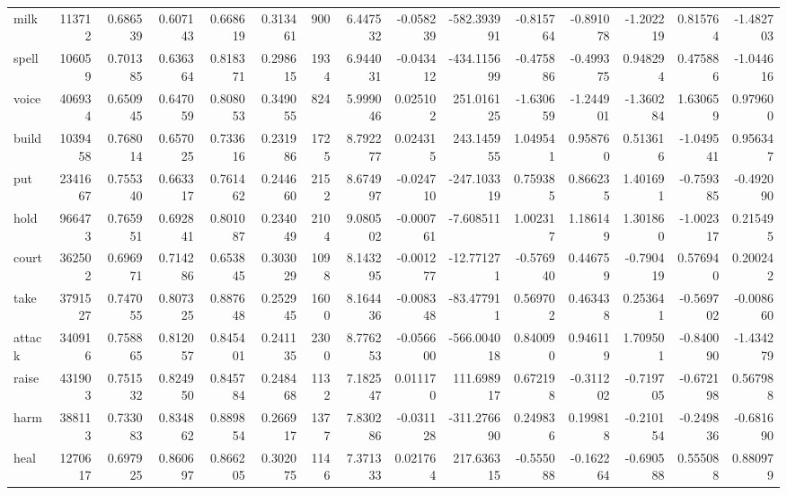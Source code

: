 \begin{tabular}{lrrrrrrrrrrrrrr}
milk      &    113712 &  0.686539 &      0.607143 &    0.668619 &  0.313461 &   900 &  6.447532 & -0.058239 & -582.393991 & -0.815764 & -0.891078 & -1.202219 &      0.815764 &        -1.482703 \\
spell     &    106059 &  0.701385 &      0.636364 &    0.818371 &  0.298615 &  1934 &  6.944031 & -0.043412 & -434.115699 & -0.475886 & -0.499375 &  0.948294 &      0.475886 &        -1.044616 \\
voice     &    406934 &  0.650945 &      0.647059 &    0.808053 &  0.349055 &   824 &  5.999046 &  0.025102 &  251.016125 & -1.630659 & -1.244901 & -1.360284 &      1.630659 &         0.979600 \\
build     &   1039458 &  0.768014 &      0.657025 &    0.733616 &  0.231986 &  1725 &  8.792277 &  0.024315 &  243.145955 &  1.049541 &  0.958760 &  0.513616 &     -1.049541 &         0.956347 \\
put       &   2341667 &  0.755340 &      0.663317 &    0.761462 &  0.244660 &  2152 &  8.674997 & -0.024710 & -247.103319 &  0.759385 &  0.866235 &  1.401691 &     -0.759385 &        -0.492090 \\
hold      &    966473 &  0.765951 &      0.692841 &    0.801087 &  0.234049 &  2104 &  9.080502 & -0.000761 &   -7.608511 &  1.002317 &  1.186149 &  1.301860 &     -1.002317 &         0.215495 \\
court     &    362502 &  0.696971 &      0.714286 &    0.653845 &  0.303029 &  1098 &  8.143295 & -0.001277 &  -12.771271 & -0.576940 &  0.446759 & -0.790419 &      0.576940 &         0.200242 \\
take      &   3791527 &  0.747055 &      0.807325 &    0.887648 &  0.252945 &  1600 &  8.164436 & -0.008348 &  -83.477911 &  0.569702 &  0.463438 &  0.253641 &     -0.569702 &        -0.008660 \\
attack    &    340916 &  0.758865 &      0.812057 &    0.845401 &  0.241135 &  2300 &  8.776253 & -0.056600 & -566.004018 &  0.840090 &  0.946119 &  1.709501 &     -0.840090 &        -1.434279 \\
raise     &    431903 &  0.751532 &      0.824950 &    0.845784 &  0.248468 &  1132 &  7.182547 &  0.011170 &  111.698917 &  0.672198 & -0.311202 & -0.719705 &     -0.672198 &         0.567988 \\
harm      &    388113 &  0.733083 &      0.834862 &    0.889854 &  0.266917 &  1377 &  7.830286 & -0.031128 & -311.276690 &  0.249836 &  0.199818 & -0.210154 &     -0.249836 &        -0.681690 \\
heal      &   1270617 &  0.697925 &      0.860697 &    0.866205 &  0.302075 &  1146 &  7.371333 &  0.021764 &  217.636315 & -0.555088 & -0.162264 & -0.690588 &      0.555088 &         0.880979 \\

\end{tabular}
